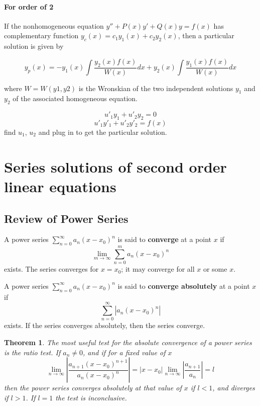\documentclass[letter]{article}
\newtheorem{theorem}{Theorem}[section]
\newenvironment{definition}[1][Definition]{\begin{trivlist}
\item[\hskip \labelsep {\bfseries #1}]}{\end{trivlist}}
\begin{document}
\paragraph{For order of 2}
 If the nonhomogeneous equation $y''+P(x)y'+Q(x)y = f(x)$ has complementary function $y_c(x) = c_1y_1(x) + c_2y_2(x)$, then a particular solution is given by

\[
y_p(x) = -y_1(x) \int{\frac{y_2(x)f(x)}{W(x)}dx} + y_2(x) \int{\frac{y_1(x)f(x)}{W(x)}dx}
\]

where $W = W(y1,y2)$ is the Wronskian of the two independent solutions $y_1$ and $y_2$ of the associated homogeneous equation.

\[u'_1y_1 + u'_2y_2 = 0\]
\[u'_1y'_1+u'_2y'_2=f(x)\]
find $u_1$, $u_2$ and plug in to get the particular solution.

\section{Series solutions of second order linear equations}

\subsection{Review of Power Series}
\begin{definition}
A power series $\sum_{n=0}^{\infty} a_n(x-x_0)^n$ is said to \textbf{converge} at a point $x$ if
\[
\lim_{m\to \infty} \sum_{n=0}^{m} a_n(x-x_0)^n
\]
exists. The series converges for $x=x_0$; it may converge for all $x$ or some $x$.
\end{definition}

\begin{definition}
A power series $\sum_{n=0}^{\infty} a_n(x-x_0)^n$ is said to \textbf{converge absolutely} at a point $x$ if
\[
\sum_{n=0}^{\infty} |a_n(x-x_0)^n|
\]
exists. If the series converges absolutely, then the series converge.
\end{definition}

\begin{theorem}
The most useful test for the absolute convergence of a power series is the ratio test. If $a_n\neq 0$, and if for a fixed value of $x$
\[
\lim_{n\to \infty} |\frac{a_{n+1}(x-x_0)^{n+1}}{a_n(x-x_0)^n}| = |x-x_0| \lim_{n\to \infty} |\frac{a_{n+1}}{a_n}| = l
\]
then the power series converges absolutely at that value of $x$ if $l < 1$, and diverges if $l>1$. If $l=1$ the test is inconclusive.
\end{theorem}
\end{document}
